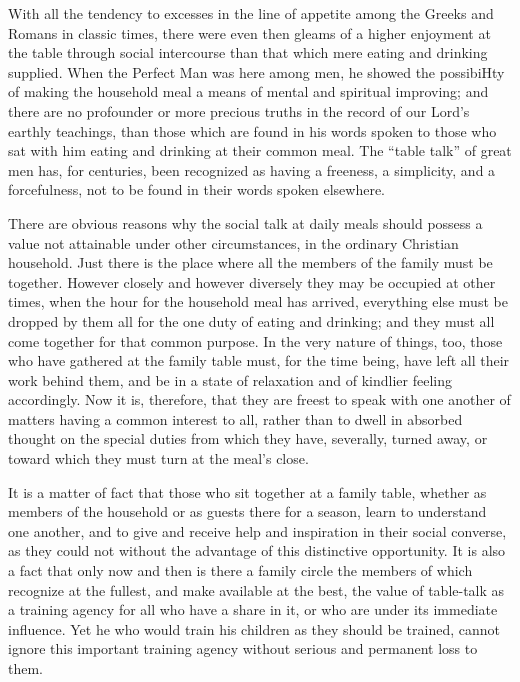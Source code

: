 \documentclass[
]{book}
\begin{document}
With all the tendency to excesses in the line of appetite among the Greeks and Romans in classic times, there were even then gleams of a higher enjoyment at the table through social intercourse than that which mere eating and drinking supplied. When the Perfect Man was here among men, he showed the possibiHty of making the household meal a means of mental and spiritual improving; and there are no profounder or more precious truths in the record of our Lord's earthly teachings, than those which are found in his words spoken to those who sat with him eating and drinking at their common meal. The ``table talk'' of great men has, for centuries, been recognized as having a freeness, a simplicity, and a forcefulness, not to be found in their words spoken elsewhere.

There are obvious reasons why the social talk at daily meals should possess a value not attainable under other circumstances, in the ordinary Christian household. Just there is the place where all the members of the family must be together. However closely and however diversely they may be occupied at other times, when the hour for the household meal has arrived, everything else must be dropped by them all for the one duty of eating and drinking; and they must all come together for that common purpose. In the very nature of things, too, those who have gathered at the family table must, for the time being, have left all their work behind them, and be in a state of relaxation and of kindlier feeling accordingly. Now it is, therefore, that they are freest to speak with one another of matters having a common interest to all, rather than to dwell in absorbed thought on the special duties from which they have, severally, turned away, or toward which they must turn at the meal's close.

It is a matter of fact that those who sit together at a family table, whether as members of the household or as guests there for a season, learn to understand one another, and to give and receive help and inspiration in their social converse, as they could not without the advantage of this distinctive opportunity. It is also a fact that only now and then is there a family circle the members of which recognize at the fullest, and make available at the best, the value of table-talk as a training agency for all who have a share in it, or who are under its immediate influence. Yet he who would train his children as they should be trained, cannot ignore this important training agency without serious and permanent loss to them.
\end{document}
